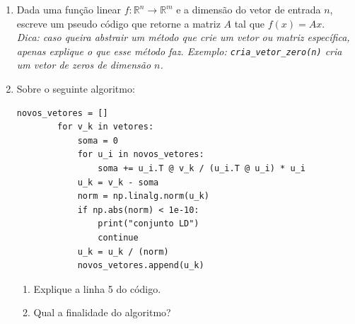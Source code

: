 \documentclass[a4paper,12pt]{article}
\begin{document}
\begin{enumerate}
    \item Dada uma função linear $f:\mathbb{R}^n \to \mathbb{R}^m$ e a dimensão do vetor de entrada $n$, escreve um pseudo código que retorne a matriz $A$ tal que $f(x) = Ax$.\\
\textit{Dica: caso queira abstrair um método que crie um vetor ou matriz específica, apenas explique o que esse método faz. Exemplo: \texttt{cria\_vetor\_zero(n)} cria um vetor de zeros de dimensão $n$.}

    \item Sobre o seguinte algoritmo:
    \begin{lstlisting}[gobble=12,caption=Exemplo de código Python]
        novos_vetores = []
        for v_k in vetores:
            soma = 0
            for u_i in novos_vetores:
                soma += u_i.T @ v_k / (u_i.T @ u_i) * u_i
            u_k = v_k - soma
            norm = np.linalg.norm(u_k)
            if np.abs(norm) < 1e-10:
                print("conjunto LD")
                continue
            u_k = u_k / (norm)
            novos_vetores.append(u_k)
    \end{lstlisting}
        \begin{enumerate}
            \item Explique a linha 5 do código.
            \item Qual a finalidade do algoritmo?
        \end{enumerate}
    
\end{enumerate}
\end{document}
